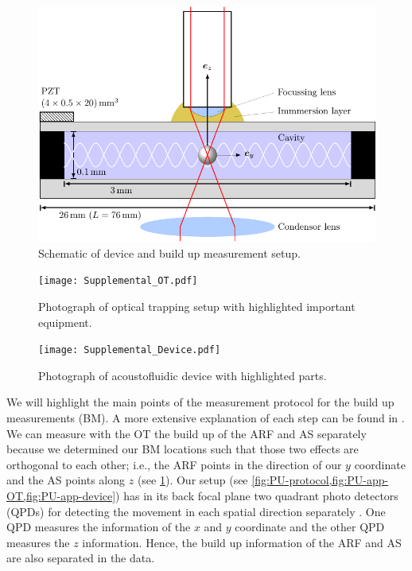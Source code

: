 \begin{figure}[tbp]
  \centering
  \includegraphics[]{External/PU-device.pdf}
  \caption{Schematic of device and build up measurement 
  setup.}\label{fig:PU-device}
\end{figure}

\begin{figure}[tbp]
  \centering
  \texttt{[image: Supplemental\_OT.pdf]}
  \caption{Photograph of optical trapping setup with highlighted important 
  equipment.\label{fig:PU-app-OT}}
\end{figure}

\begin{figure}[tbp]
  \centering
  \texttt{[image: Supplemental\_Device.pdf]}
  \caption{Photograph of acoustofluidic device with highlighted parts. 
  \label{fig:PU-app-device}}
\end{figure}

We will highlight the main points of the measurement protocol for the build up 
measurements (BM). A more extensive explanation of each step can be found in 
\citeauthor{Goering2021} \cite{Goering2021}. We can measure with the OT the 
build up of the ARF and AS separately because we determined our BM locations 
such that those two effects are orthogonal to each other; i.e., the ARF points 
in the direction of our $y$ coordinate and the AS points along $z$ (see 
\cref{fig:PU-device}). Our setup (see 
\cref{fig:PU-protocol,fig:PU-app-OT,fig:PU-app-device}) has in its back focal plane two 
quadrant photo detectors (QPDs) for detecting the movement in each spatial 
direction separately 
\cite{Lakaemper2015,Goering2021,Lamprecht2021,Lamprecht2016}. One QPD measures 
the information of the $x$ and $y$ coordinate and the other QPD measures the 
$z$ information. Hence, the build up information of the ARF and AS are also 
separated in the data.

